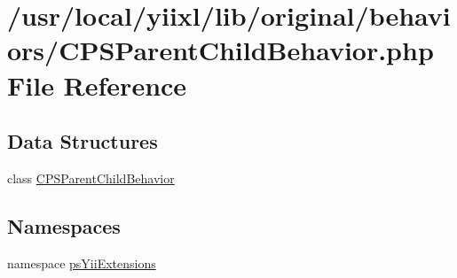 \hypertarget{CPSParentChildBehavior_8php}{
\section{/usr/local/yiixl/lib/original/behaviors/CPSParentChildBehavior.php File Reference}
\label{CPSParentChildBehavior_8php}
}
\subsection*{Data Structures}
\begin{DoxyCompactItemize}
\item 
class \hyperlink{classCPSParentChildBehavior}{CPSParentChildBehavior}
\end{DoxyCompactItemize}
\subsection*{Namespaces}
\begin{DoxyCompactItemize}
\item 
namespace \hyperlink{namespacepsYiiExtensions}{psYiiExtensions}
\end{DoxyCompactItemize}

